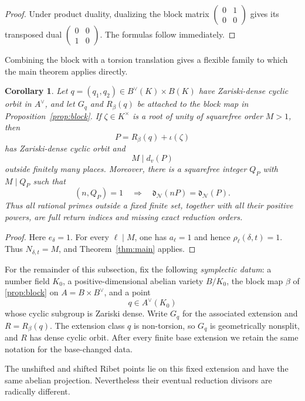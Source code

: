 \documentclass[11pt,letterpaper,reqno]{amsart}
\newtheorem{corollary}[theorem]{Corollary}
\theoremstyle{definition}
\theoremstyle{remark}
\newcommand{\dd}{\mathfrak d}
\newcommand{\Ner}{\mathcal N}
\begin{document}
\begin{proof}
Under product duality, dualizing the block matrix
$\left(\begin{smallmatrix}0&1\\0&0\end{smallmatrix}\right)$ gives its
transposed dual
$\left(\begin{smallmatrix}0&0\\1&0\end{smallmatrix}\right)$.
The formulas follow immediately.
\end{proof}

Combining the block with a torsion translation gives a flexible family to
which the main theorem applies directly.

\begin{corollary}\label{cor:block-family}
Let $q=(q_1,q_2)\in B^\vee(K)\times B(K)$ have Zariski-dense cyclic orbit in
$A^\vee$, and let $G_q$ and $R_\beta(q)$ be attached to the block map in
Proposition~\ref{prop:block}.  If $\zeta\in K^\times$ is a root of unity of squarefree
order $M>1$, then
\[
 P=R_\beta(q)+\iota(\zeta)
\]
has Zariski-dense cyclic orbit and
\[
 M\mid d_v(P)
\]
outside finitely many places.  Moreover, there is a squarefree integer $Q_P$
with $M\mid Q_P$ such that
\[
 (n,Q_P)=1
 \quad\Longrightarrow\quad
 \dd_{\Ner}(nP)=\dd_{\Ner}(P).
\]
Thus all rational primes outside a fixed finite set, together with all their
positive powers, are full return indices and missing exact reduction orders.
\end{corollary}

\begin{proof}
Here $e_\delta=1$.  For every $\ell\mid M$, one has $a_\ell=1$ and hence
$\rho_\ell(\delta,t)=1$.  Thus $N_{\delta,t}=M$, and Theorem~\ref{thm:main}
applies.
\end{proof}

For the remainder of this subsection, fix the following \emph{symplectic
datum}: a number field $K_0$, a positive-dimensional abelian variety $B/K_0$,
the block map $\beta$ of \cref{prop:block} on
$A=B\times B^\vee$, and a point
\[
        q\in A^\vee(K_0)
\]
whose cyclic subgroup is Zariski dense.  Write $G_q$ for the associated
extension and $R=R_\beta(q)$.  The extension class $q$ is non-torsion, so
$G_q$ is geometrically nonsplit, and $R$ has dense cyclic orbit.  After every
finite base extension we retain the same notation for the base-changed data.

The unshifted and shifted Ribet points lie on this fixed extension and have the
same abelian projection.  Nevertheless their eventual reduction divisors are
radically different.
\end{document}
